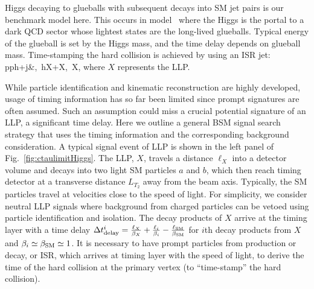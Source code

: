 Higgs decaying to glueballs with subsequent decays into SM jet pairs is our benchmark model here. This occurs in model~\cite{Craig:2015pha} where the Higgs is the portal to a dark QCD sector whose lightest states are the long-lived glueballs. 
Typical energy of the glueball is set by the Higgs mass, and the time delay depends on glueball mass. 
Time-stamping the hard collision is achieved by using an ISR jet: 
\bea
pp\rightarrow h+j&,\ h\rightarrow X+X,\ X,   %
\eea
where $X$ represents the LLP.

While particle identification and kinematic reconstruction are highly developed,  
usage of timing information has so far been limited since prompt signatures are often assumed. 
Such an assumption could miss a crucial potential signature of an LLP, a significant time delay. 
Here we outline a general BSM signal search strategy that uses the timing information
and the corresponding background consideration.
A typical signal event of LLP is shown in the left panel of Fig.~\ref{fig:ctaulimitHiggs}. 
The LLP, $X$, travels a distance $\ell_X$ into a detector volume and decays into two light SM particles 
$a$ and $b$, which then reach timing detector at a transverse distance $L_{T_2}$ away from the beam axis. Typically, the SM particles travel at velocities close to the speed of light.
For simplicity, we consider neutral LLP signals where background from charged particles can be vetoed using 
particle identification and isolation.
The decay products of $X$ arrive at the timing layer with a time delay
$
\Delta t^i_{\rm delay} = \frac{\ell_X}{\beta_X} + \frac{\ell_i}{\beta_i} - \frac{\ell_{\rm SM}}{\beta_{\rm SM}}
$
for $i$th decay products from $X$ and $\beta_i \simeq \beta_{\rm SM} \simeq 1 $. 
It is necessary to have prompt particles from production or decay, or ISR, which arrives at timing layer with 
the speed of light, to derive the time of the hard collision at the primary vertex (to ``time-stamp'' the hard collision).\\


